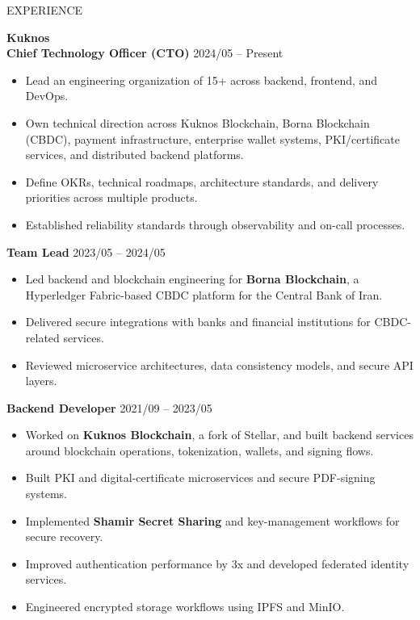 \documentclass{resume}
\begin{document}

\begin{rSection}{EXPERIENCE}

\textbf{Kuknos} \hfill \\
\textbf{Chief Technology Officer (CTO)} \hfill 2024/05 -- Present
\begin{itemize}
    \item Lead an engineering organization of 15+ across backend, frontend, and DevOps.
    \item Own technical direction across Kuknos Blockchain, Borna Blockchain (CBDC), payment infrastructure, enterprise wallet systems, PKI/certificate services, and distributed backend platforms.
    \item Define OKRs, technical roadmaps, architecture standards, and delivery priorities across multiple products.
    \item Established reliability standards through observability and on-call processes.
\end{itemize}

\textbf{Team Lead} \hfill 2023/05 -- 2024/05
\begin{itemize}
    \item Led backend and blockchain engineering for \textbf{Borna Blockchain}, a Hyperledger Fabric-based CBDC platform for the Central Bank of Iran.
    \item Delivered secure integrations with banks and financial institutions for CBDC-related services.
    \item Reviewed microservice architectures, data consistency models, and secure API layers.
\end{itemize}

\textbf{Backend Developer} \hfill 2021/09 -- 2023/05
\begin{itemize}
    \item Worked on \textbf{Kuknos Blockchain}, a fork of Stellar, and built backend services around blockchain operations, tokenization, wallets, and signing flows.
    \item Built PKI and digital-certificate microservices and secure PDF-signing systems.
    \item Implemented \textbf{Shamir Secret Sharing} and key-management workflows for secure recovery.
    \item Improved authentication performance by 3x and developed federated identity services.
    \item Engineered encrypted storage workflows using IPFS and MinIO.
\end{itemize}


\end{rSection}
\end{document}
